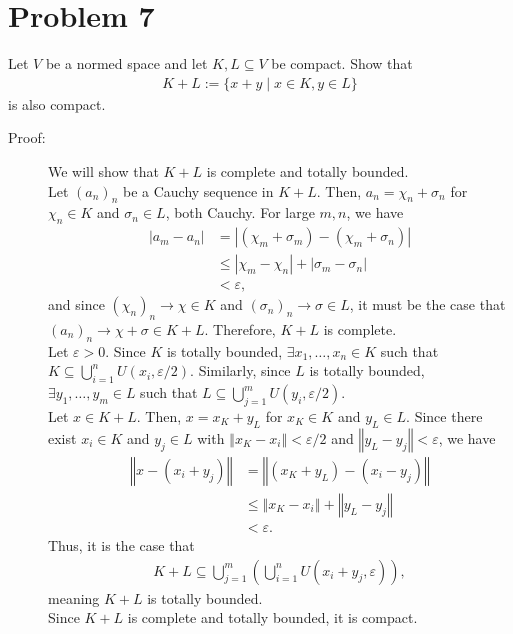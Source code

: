 \documentclass[10pt]{extarticle}
\newcommand{\norm}[1]{\left\Vert #1\right\Vert}
\begin{document}
  \section{Problem 7}%
  Let $V$ be a normed space and let $K,L\subseteq V$ be compact. Show that
  \begin{align*}
    K+L := \{x+y\mid x\in K,y\in L\}
  \end{align*}
  is also compact.
  \begin{description}
    \item[Proof:] We will show that $K+L$ is complete and totally bounded.\\

      Let $(a_n)_n$ be a Cauchy sequence in $K+L$. Then, $a_n = \chi_n + \sigma_n$  for $\chi_n\in K$ and $\sigma_n\in L$, both Cauchy. For large $m,n$, we have
      \begin{align*}
        |a_m - a_n| &= |(\chi_m + \sigma_m) - (\chi_m + \sigma_n)|\\
                    &\leq |\chi_m - \chi_n| + |\sigma_m - \sigma_n|\\
                    &< \varepsilon,
      \end{align*}
      and since $(\chi_n)_n \rightarrow \chi\in K$ and $(\sigma_n)_n\rightarrow \sigma \in L$, it must be the case that $(a_n)_n \rightarrow \chi + \sigma \in K+L$. Therefore, $K+L$ is complete.\\

      Let $\varepsilon > 0$. Since $K$ is totally bounded, $\exists x_1,\dots,x_n\in K$ such that $K\subseteq \bigcup_{i=1}^{n} U(x_i,\varepsilon/2)$. Similarly, since $L$ is totally bounded, $\exists y_1,\dots,y_m\in L$ such that $L\subseteq \bigcup_{j=1}^{m}U(y_i,\varepsilon/2)$.\\

      Let $x\in K+L$. Then, $x = x_K + y_L$ for $x_K\in K$ and $y_L\in L$. Since there exist $x_i\in K$ and $y_j\in L$ with $\norm{x_K-x_i} < \varepsilon/2$ and $\norm{y_L-y_j}< \varepsilon$, we have
      \begin{align*}
        \norm{x - (x_i + y_j)} &= \norm{(x_K + y_L) - (x_i - y_j)}\\
                               &\leq \norm{x_K - x_i} + \norm{y_L - y_j}\\
                               &< \varepsilon.
      \end{align*}
      Thus, it is the case that
      \begin{align*}
        K+L \subseteq \bigcup_{j=1}^{m}\left(\bigcup_{i=1}^{n}U(x_i + y_j,\varepsilon)\right),
      \end{align*}
      meaning $K+L$ is totally bounded.\\

      Since $K+L$ is complete and totally bounded, it is compact.
  \end{description}
\end{document}
